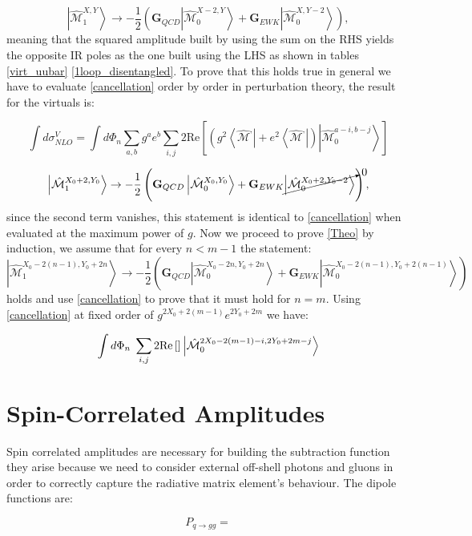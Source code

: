\documentclass[a4paper]{article}
\def \Int#1{\int d#1 \hskip0.1cm}
\def \MBra#1#2#3{\left<\hat{\mathcal{M}}_{#1}^{#2,#3}\right|}
\def \MKet#1#2#3{\left|\hat{\mathcal{M}}_{#1}^{#2,#3}\right>}
\begin{document}
\begin{equation}
 \MKet{1}{X}{Y} \rightarrow -\frac{1}{2}
 \left(
 \textbf{G}_{QCD}\MKet{0}{X-2}{Y} 
 + 
 \textbf{G}_{EWK}\MKet{0}{X}{Y-2}
 \right),
 \label{Theo}
\end{equation}
meaning that the squared amplitude built by using the sum on the RHS yields the opposite IR poles as the 
one built using the LHS as shown in tables \ref{virt_uubar} \ref{1loop_disentangled}. 
To prove that this holds true in general we have to evaluate \eqref{cancellation} order by order in 
perturbation theory, the result for the virtuals is:

\begin{equation}
 \int d\sigma^V_{NLO} = 
 \int d\Phi_{n}\sum_{a,b}
 g^a e^b 
 \sum_{i,j}
 2\text{Re}\left[
 \left(
  g^2\MBra{}{}{}
 +e^2\MBra{}{}{}
 \right)
 \left|{\hat{\mathcal{M}}}^{a-i,b-j}_{0}\right>
 \right]
\end{equation}



\begin{equation}
 \MKet{1}{X_0+2}{Y_0} \rightarrow -\frac{1}{2}
 \left(
 \textbf{G}_{QCD}\MKet{0}{X_0}{Y_0} 
 + 
 \textbf{G}_{EWK}\cancelto{0}{\MKet{0}{X_0+2}{Y_0-2}}
 \right),
 \label{boundary}
\end{equation}
since the second term vanishes, this statement is identical to \eqref{cancellation} when evaluated at the maximum power of $g$. Now we proceed to prove \eqref{Theo} by induction, we assume that for every $n<m-1$ the statement:
\begin{equation}
  \MKet{1}{X_0-2(n-1)}{Y_0+2n}\rightarrow -\frac{1}{2}
  \left(
  \textbf{G}_{QCD}\MKet{0}{X_0-2n}{Y_0+2n} 
 + 
 \textbf{G}_{EWK}\MKet{0}{X_0-2(n-1)}{Y_0+2(n-1)}
 \right)
\end{equation}
holds and use \eqref{cancellation} to prove that it must hold for $n=m$. Using \eqref{cancellation} at fixed 
order of $g^{2X_0+2(m-1)}e^{2Y_0+2m}$ we have:

\begin{equation}
 \Int{\Phi_n} \sum_{i,j}2\text{Re}\left[\right]\MKet{0}{2X_0-2(m-1)-i}{2Y_0+2m-j}
\end{equation}




\section{Spin-Correlated Amplitudes}
Spin correlated amplitudes are necessary for building the subtraction function they arise because 
we need to consider external off-shell photons and gluons in order to correctly capture the 
radiative matrix element's behaviour. The dipole functions are:

\begin{equation}
 P_{q\rightarrow gg} = 
\end{equation}
\end{document}

